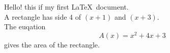 \documentclass[11pt]{article}
\begin{document}
Hello! this if my first \LaTeX\ document.\\
A  rectangle has side 4 of $(x+1)$ and $(x+3)$.\\
The euqation $${A(x) = x^2 + 4x + 3}$$ gives the area of the rectangle.
\end{document}
